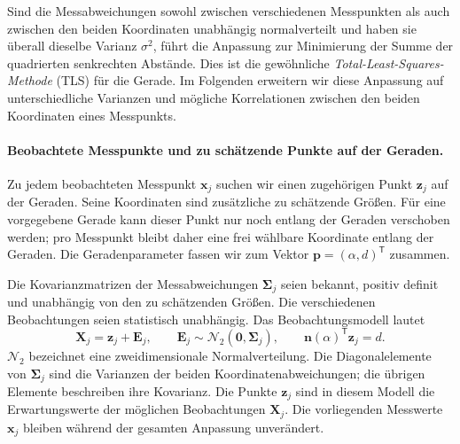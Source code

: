 Sind die Messabweichungen sowohl zwischen verschiedenen Messpunkten als
auch zwischen den beiden Koordinaten unabhängig normalverteilt und
haben sie überall dieselbe Varianz $\sigma^2$, führt die Anpassung zur
Minimierung der Summe der quadrierten senkrechten Abstände.
Dies ist die gewöhnliche \textsl{Total-Least-Squares-Methode} (TLS)
für die Gerade. Im Folgenden erweitern wir diese Anpassung auf
unterschiedliche Varianzen und mögliche Korrelationen zwischen den
beiden Koordinaten eines Messpunkts.

\paragraph{Beobachtete Messpunkte und zu schätzende Punkte auf der Geraden.}
Zu jedem beobachteten Messpunkt $\mathbf{x}_j$ suchen wir einen
zugehörigen Punkt $\mathbf{z}_j$ auf der Geraden. Seine Koordinaten
sind zusätzliche zu schätzende Größen. Für eine vorgegebene Gerade
kann dieser Punkt nur noch entlang der Geraden verschoben werden;
pro Messpunkt bleibt daher eine frei wählbare Koordinate entlang der
Geraden. Die Geradenparameter fassen wir zum Vektor
$\mathbf{p}=(\alpha,d)^\mathsf{T}$ zusammen.

Die Kovarianzmatrizen der Messabweichungen $\boldsymbol{\Sigma}_j$
seien bekannt, positiv definit und unabhängig von den zu schätzenden
Größen. Die verschiedenen Beobachtungen seien statistisch unabhängig.
Das Beobachtungsmodell lautet
\begin{equation}
\mathbf{X}_j=\mathbf{z}_j+\mathbf{E}_j,
\qquad
\mathbf{E}_j\sim\mathcal{N}_2(\mathbf{0},\boldsymbol{\Sigma}_j),
\qquad
\mathbf{n}(\alpha)^\mathsf{T}\mathbf{z}_j=d.
\label{V4GeradeBeobachtungsmodell}
\end{equation}
$\mathcal{N}_2$ bezeichnet eine zweidimensionale Normalverteilung.
Die Diagonalelemente von $\boldsymbol{\Sigma}_j$ sind die Varianzen
der beiden Koordinatenabweichungen; die übrigen Elemente beschreiben
ihre Kovarianz. Die Punkte $\mathbf{z}_j$ sind in diesem Modell die
Erwartungswerte der möglichen Beobachtungen $\mathbf{X}_j$.
Die vorliegenden Messwerte $\mathbf{x}_j$ bleiben während der gesamten
Anpassung unverändert.

